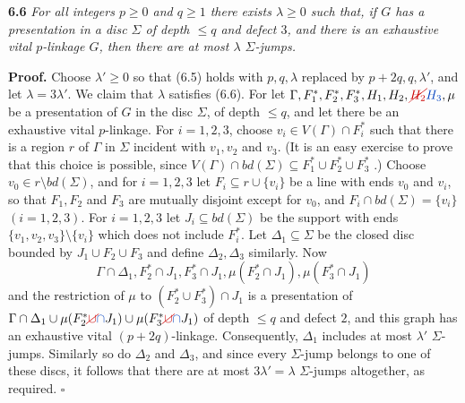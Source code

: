 \textbf{6.6} \textit{For all integers $p \ge 0$ and $q \ge 1$ there exists $\lambda \ge 0$ such that, if $G$ has a presentation in a disc $\Sigma$ of depth $\le q$ and defect $3$, and there is an exhaustive vital $p$-linkage  $G$, then there are at most $\lambda$ $\Sigma$-jumps.}

\textbf{Proof.} Choose $\lambda' \ge 0$ so that (6.5) holds with $p, q, \lambda$ replaced by $p + 2q, q, \lambda'$, and let $\lambda = 3\lambda'$. We claim that $\lambda$ satisfies (6.6). For let $\Gamma, F_1^*, F_2^*, F_3^*, H_1, H_2, \delm{H_2}\fix{H_3}, \mu$ be a presentation of $G$ in the disc $\Sigma$, of depth $\le q$, and let there be an exhaustive vital $p$-linkage. For $i = 1, 2, 3$, choose $v_i \in V(\Gamma) \cap F_i^*$ such that there is a region $r$ of $\Gamma$ in $\Sigma$ incident with $v_1, v_2$ and $v_3$. (It is an easy exercise to prove that this choice is possible, since $V(\Gamma) \cap bd(\Sigma) \subseteq F_1^* \cup F_2^* \cup F_3^*$ .) Choose $v_0 \in r \setminus bd(\Sigma)$, and for $i = 1, 2, 3$ let $F_i \subseteq r \cup \{v_i\}$ be a line with ends $v_0$ and $v_i$, so that $F_1, F_2$ and $F_3$ are mutually disjoint except for $v_0$, and $F_i \cap bd(\Sigma) = \{v_i\}$ $(i = 1, 2, 3)$. For $i = 1, 2, 3$ let $J_i \subseteq bd(\Sigma)$ be the support with ends $\{v_1, v_2, v_3\} \setminus \{v_i\}$ which does not include $F_i^*$. Let $\Delta_1 \subseteq \Sigma$ be the closed disc bounded by $J_1 \cup F_2 \cup F_3$ and define $\Delta_2, \Delta_3$ similarly. Now
\begin{equation*}
\Gamma \cap \Delta_1, F_2^* \cap J_1, F_3^* \cap J_1, \mu(F_2^* \cap J_1), \mu(F_3^* \cap J_1)
\end{equation*}
and the restriction of $\mu$ to $(F_2^* \cup F_3^*) \cap J_1$ is a presentation of $\Gamma \cap \Delta_1 \cup \mu(F_2^* \delm{\cup}\fix{\cap} J_1) \cup \mu(F_3^* \delm{\cup}\fix{\cap} J_1)$ of depth $\le q$ and defect $2$, and this graph has an exhaustive vital $(p + 2q)$-linkage. Consequently, $\Delta_1$ includes at most $\lambda'$ $\Sigma$-jumps. Similarly so do $\Delta_2$ and $\Delta_3$, and since every $\Sigma$-jump belongs to one of these discs, it follows that there are at most $3\lambda' = \lambda$ $\Sigma$-jumps altogether, as required. $\square$

